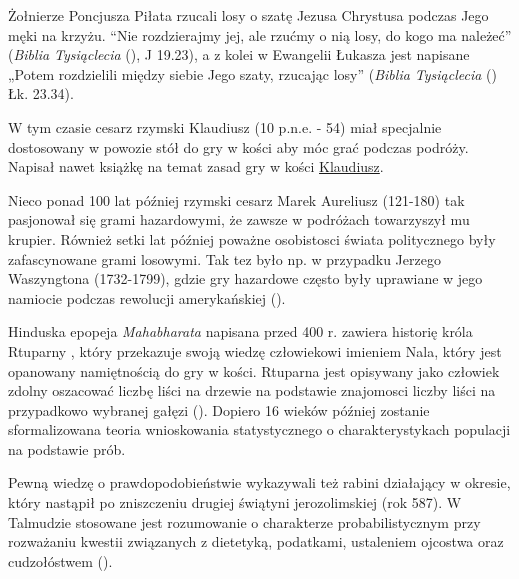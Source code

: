 \documentclass[
  letterpaper,
  DIV=11,
  numbers=noendperiod]{scrreprt}
\begin{document}
Żołnierze Poncjusza Piłata rzucali losy o szatę Jezusa Chrystusa podczas
Jego męki na krzyżu. ``Nie rozdzierajmy jej, ale rzućmy o nią losy, do
kogo ma należeć'' (\emph{Biblia Tysiąclecia}
(), J 19.23), a z kolei w
Ewangelii Łukasza jest napisane „Potem rozdzielili między siebie Jego
szaty, rzucając losy'' (\emph{Biblia Tysiąclecia}
() Łk. 23.34).

W tym czasie cesarz rzymski Klaudiusz (10 p.n.e. - 54) miał specjalnie
dostosowany w powozie stół do gry w kości aby móc grać podczas podróży.
Napisał nawet książkę na temat zasad gry w kości
\href{https://imperiumromanum.pl/spoleczenstwo/rozrywka-w-starozytnym-rzymie/hazard-antycznych-rzymian/}{Klaudiusz}.

Nieco ponad 100 lat później rzymski cesarz Marek Aureliusz (121-180) tak
pasjonował się grami hazardowymi, że zawsze w podróżach towarzyszył mu
krupier. Również setki lat później poważne osobistosci świata
politycznego były zafascynowane grami losowymi. Tak tez było np. w
przypadku Jerzego Waszyngtona (1732-1799), gdzie gry hazardowe często
były uprawiane w jego namiocie podczas rewolucji amerykańskiej
().

Hinduska epopeja \emph{Mahabharata} napisana przed 400 r. zawiera
historię króla Rtuparny , który przekazuje swoją wiedzę człowiekowi
imieniem Nala, który jest opanowany namiętnością do gry w kości.
Rtuparna jest opisywany jako człowiek zdolny oszacować liczbę liści na
drzewie na podstawie znajomosci liczby liści na przypadkowo wybranej
gałęzi (). Dopiero 16
wieków później zostanie sformalizowana teoria wnioskowania
statystycznego o charakterystykach populacji na podstawie prób.

Pewną wiedzę o prawdopodobieństwie wykazywali też rabini działający w
okresie, który nastąpił po zniszczeniu drugiej świątyni jerozolimskiej
(rok 587). W Talmudzie stosowane jest rozumowanie o charakterze
probabilistycznym przy rozważaniu kwestii związanych z dietetyką,
podatkami, ustaleniem ojcostwa oraz cudzołóstwem
().
\end{document}
